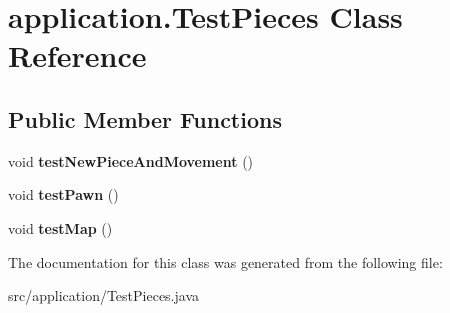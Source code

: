 \hypertarget{classapplication_1_1_test_pieces}{\section{application.\+Test\+Pieces Class Reference}
\label{classapplication_1_1_test_pieces}
}
\subsection*{Public Member Functions}
\begin{DoxyCompactItemize}
\item 
\hypertarget{classapplication_1_1_test_pieces_a094b2565c1fdc0e2e7922bba293177c3}{void {\bfseries test\+New\+Piece\+And\+Movement} ()}\label{classapplication_1_1_test_pieces_a094b2565c1fdc0e2e7922bba293177c3}

\item 
\hypertarget{classapplication_1_1_test_pieces_a189cac1b28dd55ca94d0258d4d4ec728}{void {\bfseries test\+Pawn} ()}\label{classapplication_1_1_test_pieces_a189cac1b28dd55ca94d0258d4d4ec728}

\item 
\hypertarget{classapplication_1_1_test_pieces_ae60c7806e5644c400d5d3d1a44496fa3}{void {\bfseries test\+Map} ()}\label{classapplication_1_1_test_pieces_ae60c7806e5644c400d5d3d1a44496fa3}

\end{DoxyCompactItemize}


The documentation for this class was generated from the following file\+:\begin{DoxyCompactItemize}
\item 
src/application/Test\+Pieces.\+java\end{DoxyCompactItemize}
